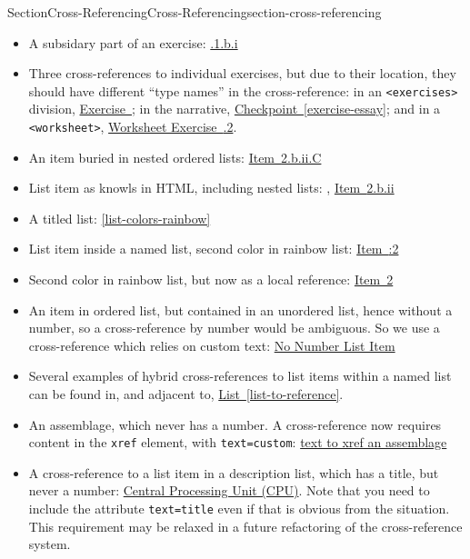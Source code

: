 \documentclass[twoside,10pt,]{article}
\newcommand{\xreffont}{\relax}
\newcommand{\mono}[1]{\texttt{#1}}
\numberwithin{equation}{section}
\begin{document}
\begin{sectionptx}{Section}{Cross-Referencing}{}{Cross-Referencing}{}{}{section-cross-referencing}
\begin{itemize}[label=\textbullet]
\item{}A subsidary part of an exercise: \hyperlink{exercise-one-two-one}{{\xreffont 12.10.1.b.i}}%
\item{} Three cross-references to individual exercises, but due to their location, they should have different ``type names'' in the cross-reference: in an \mono{<exercises>} division, \hyperlink{duplicate-divisional}{Exercise~{\xreffont 37.2}}; in the narrative, \hyperref[exercise-essay]{Checkpoint~{\xreffont\ref{exercise-essay}}}; and in a \mono{<worksheet>}, \hyperlink{exercise-vector-addition}{Worksheet Exercise~{\xreffont 35.1.2}}.%
\item{}An item buried in nested ordered lists: \hyperlink{list-two-two-two-three}{Item~{\xreffont 2.b.ii.C}}%
\item{}List item as knowls in HTML, including nested lists: \hyperlink{list-two}{{\xreffont 2}}, \hyperlink{list-two-two-two}{Item~{\xreffont 2.b.ii}}%
\item{}A titled list: \hyperref[list-colors-rainbow]{{\xreffont\ref{list-colors-rainbow}}}%
\item{}List item inside a named list, second color in rainbow list: \hyperlink{rainbow-orange}{Item~{\xreffont 12.3:2}}%
\item{}Second color in rainbow list, but now as a local reference: \hyperlink{rainbow-orange}{Item~2}%
\item{}An item in ordered list, but contained in an unordered list, hence without a number, so a cross-reference by number would be ambiguous.  So we use a cross-reference which relies on custom text: \hyperlink{target-no-number}{No Number List Item}%
\item{}Several examples of hybrid cross-references to list items within a named list can be found in, and adjacent to, \hyperref[list-to-reference]{List~{\xreffont\ref{list-to-reference}}}.%
\item{}An assemblage, which never has a number.  A cross-reference now requires content in the \mono{xref} element, with \mono{text=\textquotesingle{}custom\textquotesingle{}}: \hyperref[assemblage-basics]{text to xref an assemblage}%
\item{}A cross-reference to a list item in a description list, which has a title, but never a number: \hyperlink{cpu-definition}{Central Processing Unit (CPU)}.  Note that you need to include the attribute \mono{text=\textquotedbl{}title\textquotedbl{}} even if that is obvious from the situation.  This requirement may be relaxed in a future refactoring of the cross-reference system.%

\end{itemize}
\end{sectionptx}
\end{document}

